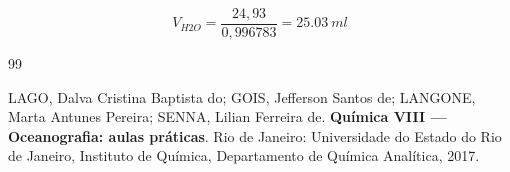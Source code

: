 \documentclass[a4paper,12pt]{article}
\begin{document}
\[
    V_{H2O}=\frac{24,93}{0,996783}=\SI{25,03}{ml}
\]


\newpage
{}
{}
\begin{thebibliography}{99}

LAGO, Dalva Cristina Baptista do;
GOIS, Jefferson Santos de;
LANGONE, Marta Antunes Pereira;
SENNA, Lilian Ferreira de.
\textbf{Química VIII — Oceanografia: aulas práticas}.
Rio de Janeiro: Universidade do Estado do Rio de Janeiro, Instituto de Química, Departamento de Química Analítica, 2017.

\end{thebibliography}
\end{document}
